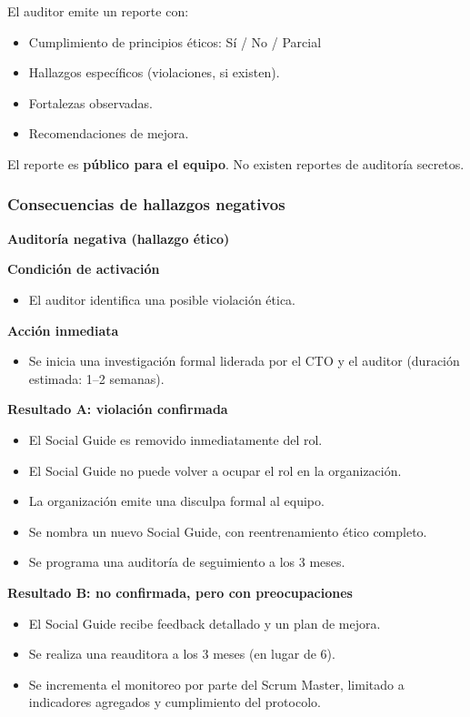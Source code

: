El auditor emite un reporte con:
\begin{itemize}
    \item Cumplimiento de principios éticos: Sí / No / Parcial
    \item Hallazgos específicos (violaciones, si existen).
    \item Fortalezas observadas.
    \item Recomendaciones de mejora.
\end{itemize}

El reporte es \textbf{público para el equipo}. No existen reportes de auditoría secretos.

\subsubsection{Consecuencias de hallazgos negativos}

\begin{protocolo}
    \textbf{Auditoría negativa (hallazgo ético)}

    \textbf{Condición de activación}
    \begin{itemize}
        \item El auditor identifica una posible violación ética.
    \end{itemize}

    \textbf{Acción inmediata}
    \begin{itemize}
        \item Se inicia una investigación formal liderada por el CTO y el auditor (duración estimada: 1--2 semanas).
    \end{itemize}

    \textbf{Resultado A: violación confirmada}
    \begin{itemize}
        \item El Social Guide es removido inmediatamente del rol.
        \item El Social Guide no puede volver a ocupar el rol en la organización.
        \item La organización emite una disculpa formal al equipo.
        \item Se nombra un nuevo Social Guide, con reentrenamiento ético completo.
        \item Se programa una auditoría de seguimiento a los 3 meses.
    \end{itemize}

    \textbf{Resultado B: no confirmada, pero con preocupaciones}
    \begin{itemize}
        \item El Social Guide recibe feedback detallado y un plan de mejora.
        \item Se realiza una reauditora a los 3 meses (en lugar de 6).
        \item Se incrementa el monitoreo por parte del Scrum Master, limitado a indicadores agregados y cumplimiento del protocolo.
    \end{itemize}
\end{protocolo}

